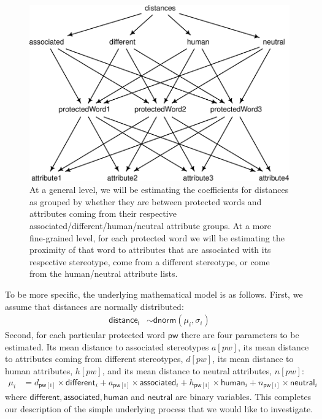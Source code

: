 \documentclass{clv3}
\begin{document}
\begin{figure}

\begin{center}\includegraphics[width=0.8\linewidth]{figures/dagVis} \end{center}

\caption{At a general level, we will be estimating the coefficients for distances as grouped by whether they are between protected words and attributes coming from their respective associated/different/human/neutral attribute groups. At a more fine-grained level, for each protected word we will be estimating the proximity of that word to attributes that are associated with its respective stereotype, come from a different stereotype, or come from the human/neutral attribute lists.}
\label{fig:visDag}
\end{figure}

To be more specific, the underlying mathematical model is as follows.
First, we assume that distances are normally distributed:
\begin{align*} \mathsf{distance_i} & \sim \mathsf{dnorm}(\mu_i,\sigma_i)
\end{align*} \noindent Second, for each particular protected word
\(\mathsf{pw}\) there are four parameters to be estimated. Its mean
distance to associated stereotypes \(a[pw]\), its mean distance to
attributes coming from different stereotypes, \(d[pw]\), its mean
distance to human attributes, \(h[pw]\), and its mean distance to
neutral attributes, \(n[pw]\): \begin{align*}
\mu_i & = d_{\mathsf{pw[i]}} \times \mathsf{different}_i  + a_{\mathsf{pw[i]}} \times \mathsf{associated}_i  + h_{\mathsf{pw[i]}} \times \mathsf{human}_i  + n_{\mathsf{pw[i]}}\times \mathsf{neutral}_i
\end{align*} \noindent where
\(\mathsf{different}, \mathsf{associated},\mathsf{human}\) and
\(\mathsf{neutral}\) are binary variables. This completes our
description of the simple underlying process that we would like to
investigate.
\end{document}
